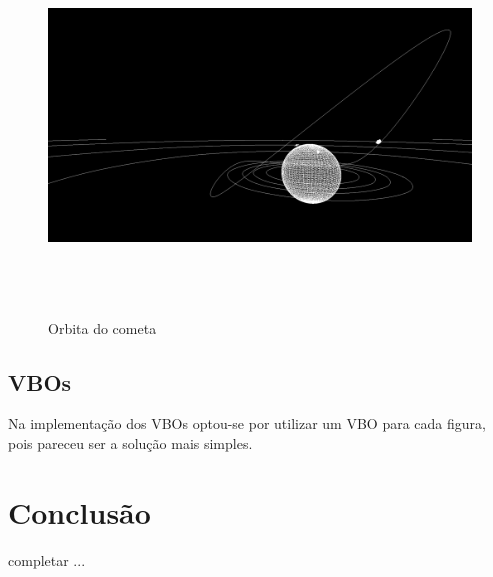 \documentclass[11pt,a4paper]{report}
\begin{document}
\begin{figure}[H]
\centering
\includegraphics[width = 18cm,height = 10cm]{ss4.png}
\caption{Orbita do cometa}
\label{fig:demo4}
\end{figure}

\newpage

\section{VBOs}
Na implementação dos VBOs optou-se por utilizar um VBO para cada figura, pois pareceu ser a solução mais simples.

\newpage


\newpage
\chapter{Conclusão}
completar ...
\end{document}
